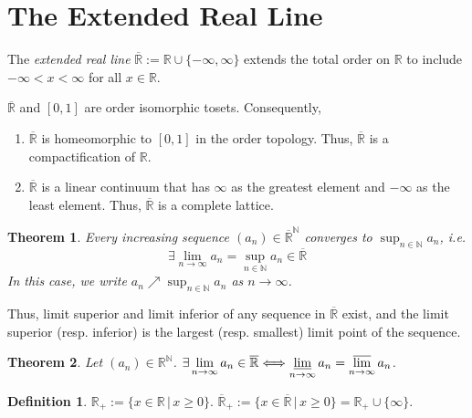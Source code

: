 \documentclass[11pt, a4paper, openany]{book}
\newtheorem{thm}{Theorem}\newtheorem{lem}{Lemma}\newtheorem{crl}{Corollary}
\theoremstyle{definition}
\newtheorem{define}{Definition}\newtheorem{exam}{Example}\newtheorem{remark}{Remark}
\newcommand{\er}{\overline{\mathbb{R}}}
\begin{document}
\section{The Extended Real Line}
    The \textit{extended real line} $\er:=\mathbb{R}\cup\{-\infty,\infty\}$ extends the total order on $\mathbb{R}$ to include $-\infty<x<\infty$ for all $x\in\mathbb{R}$. 
    
    $\er$ and $[0,1]$ are order isomorphic tosets. Consequently,
    \begin{enumerate}
        \item $\er$ is homeomorphic to $[0,1]$ in the order topology. Thus, $\er$ is a compactification of $\mathbb{R}$.
        \item $\er$ is a linear continuum that has $\infty$ as the greatest element and $-\infty$ as the least element. Thus, $\er$ is a complete lattice.
    \end{enumerate}
    \begin{thm}
        Every increasing sequence $(a_n)\in\er^\mathbb{N}$ converges to $\sup_{n\in\mathbb{N}}a_n$, i.e.
        \[
            \exists \lim_{n\to\infty} a_n=\sup_{n\in\mathbb{N}}a_n\in\overline{\mathbb{R}}
        \]
        In this case, we write $a_n\nearrow \sup_{n\in\mathbb{N}}a_n$ as $n\to \infty$.
    \end{thm}
    Thus, limit superior and limit inferior of any sequence in $\er$ exist, and the limit superior (resp. inferior) is the largest (resp. smallest) limit point of the sequence.
    \begin{thm}
        Let $(a_n)\in \mathbb{R}^\mathbb{N}$. $\exists \lim\limits_{n\to \infty}a_n\in\er\Longleftrightarrow \varliminf\limits_{n\to\infty}a_n=\varlimsup\limits_{n\to \infty}a_n$.
    \end{thm}
    \begin{define}
        $\mathbb{R}_+:=\{x\in\mathbb{R}\,|\,x\geqslant 0\}$. $\er_+:=\{x\in\er\,|\,x\geqslant 0\}=\mathbb{R}_+\cup\{\infty\}$.
    \end{define}
\end{document}
